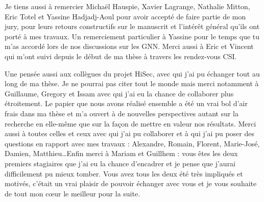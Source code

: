 \documentclass[french,a4paper,11pt,twoside]{StyleThese}
\begin{document}
Je tiens aussi à remercier Michaël Hauspie, Xavier Lagrange, Nathalie Mitton, Eric Totel et Yassine Hadjadj-Aoul pour avoir accepté de faire partie de mon jury, pour leurs retours constructifs sur le manuscrit et l'intérêt général qu'ils ont porté à mes travaux. Un remerciement particulier à Yassine pour le temps que tu m'as accordé lors de nos discussions sur les GNN. Merci aussi à Eric et Vincent qui m'ont suivi depuis le début de ma thèse à travers les rendez-vous CSI.

Une pensée aussi aux collègues du projet HiSec, avec qui j'ai pu échanger tout au long de ma thèse. Je ne pourrai pas citer tout le monde mais merci notamment à Guillaume, Gregory et Issam avec qui j'ai eu la chance de collaborer plus étroitement. Le papier que nous avons réalisé ensemble a été un vrai bol d'air frais dans ma thèse et m'a ouvert à de nouvelles perspectives autant sur la recherche en elle-même que sur la façon de mettre en valeur nos résultats. Merci aussi à toutes celles et ceux avec qui j'ai pu collaborer et à qui j'ai pu poser des questions en rapport avec mes travaux : Alexandre, Romain, Florent, Marie-José, Damien, Matthieu\dots Enfin merci à Mariam et Guillhem : vous êtes les deux premiers stagiaires que j'ai eu la chance d'encadrer et je pense que j'aurai difficilement pu mieux tomber. Vous avez tous les deux été très impliqués et motivés, c'était un vrai plaisir de pouvoir échanger avec vous et je vous souhaite de tout mon cœur le meilleur pour la suite.

\newpage
\end{document}
